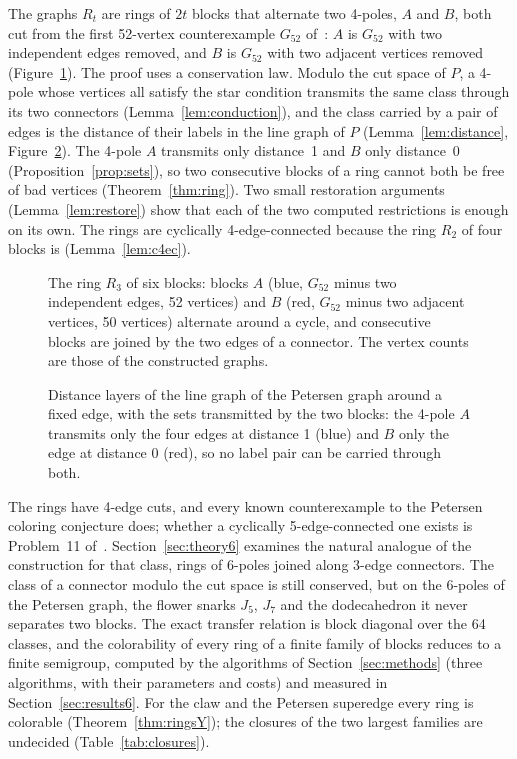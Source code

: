 \documentclass[11pt]{article}
\theoremstyle{definition}
\theoremstyle{remark}
\newcommand{\PG}{P}
\newcommand{\Gfty}{G_{52}}
\begin{document}
The graphs $R_t$ are rings of $2t$ blocks that alternate two 4-poles, $A$ and $B$, both cut from
the first 52-vertex counterexample $\Gfty$ of~\cite{GJMMMU2026}: $A$ is $\Gfty$ with two
independent edges removed, and $B$ is $\Gfty$ with two adjacent vertices removed
(Figure~\ref{fig:ring}). The proof uses a conservation law. Modulo the cut space of $\PG$, a 4-pole
whose vertices all satisfy the star condition transmits the same class through its two connectors
(Lemma~\ref{lem:conduction}), and the class carried by a pair of edges is the distance of their
labels in the line graph of $\PG$ (Lemma~\ref{lem:distance}, Figure~\ref{fig:linegraph}). The 4-pole
$A$ transmits only distance~1 and $B$ only distance~0 (Proposition~\ref{prop:sets}), so two
consecutive blocks of a ring cannot both be free of bad vertices (Theorem~\ref{thm:ring}). Two small
restoration arguments (Lemma~\ref{lem:restore}) show that each of the two computed restrictions is
enough on its own. The rings are cyclically 4-edge-connected because the ring $R_2$ of four blocks is
(Lemma~\ref{lem:c4ec}).

\begin{figure}[t]\centering

\caption{The ring $R_3$ of six blocks: blocks $A$ (blue, $\Gfty$ minus two independent edges, 52 vertices) and $B$
(red, $\Gfty$ minus two adjacent vertices, 50 vertices) alternate around a cycle, and consecutive blocks are
joined by the two edges of a connector. The vertex counts are those of the constructed graphs.}\label{fig:ring}
\end{figure}

\begin{figure}[t]\centering

\caption{Distance layers of the line graph of the Petersen graph around a fixed edge, with the sets transmitted by the two blocks:
the 4-pole $A$ transmits only the four edges at distance 1 (blue) and $B$ only the edge at distance 0 (red), so no label pair
can be carried through both.}\label{fig:linegraph}
\end{figure}

The rings have 4-edge cuts, and every known counterexample to the Petersen coloring conjecture
does; whether a cyclically 5-edge-connected one exists is Problem~11 of~\cite{GJMMMU2026}.
Section~\ref{sec:theory6} examines the natural analogue of the construction for that class, rings
of 6-poles joined along 3-edge connectors. The class of a connector modulo the cut space is still
conserved, but on the 6-poles of the Petersen graph, the flower snarks $J_5$, $J_7$ and the
dodecahedron it never separates two blocks. The exact transfer relation is block diagonal over the
64 classes, and the colorability of every ring of a finite family of blocks reduces to a finite
semigroup, computed by the algorithms of Section~\ref{sec:methods} (three algorithms, with their
parameters and costs) and measured in Section~\ref{sec:results6}. For the claw and the Petersen
superedge every ring is colorable (Theorem~\ref{thm:ringsY}); the closures of the two largest
families are undecided (Table~\ref{tab:closures}).
\end{document}
